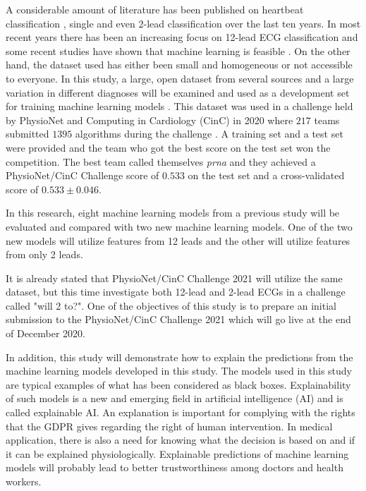 A considerable amount of literature has been published on heartbeat classification \cite{annam_classification_2020}, single \cite{mathews_novel_2018} and even  2-lead classification \cite{liu_arrhythmia_2013} over the last ten years. In most recent years there has been an increasing focus on 12-lead ECG classification and some recent studies have shown that machine learning is feasible \cite{ribeiro_automatic_2020, yao_multi-class_2020,li_automatic_2020, chen_detection_2020}. On the other hand, the  dataset used has either been small and homogeneous \cite{noauthor_classification_nodate} or not accessible to everyone. In this study, a large, open dataset from several sources and a large variation in different diagnoses will be examined and used as a development set for training machine learning models \cite{alday_classification_2020}. This dataset was used in a challenge held by PhysioNet \cite{goldberger_physiobank_2000} and Computing in Cardiology (CinC) in 2020 where $217$ teams submitted $1395$ algorithms during the challenge \cite{alday_classification_2020}. A training set and a test set were provided and the team who got the best score on the test set won the competition. The best team called themselves \textit{prna} and they achieved a PhysioNet/CinC Challenge score \cite{alday_classification_2020} of $0.533$ on the test set and a cross-validated score of $0.533\pm 0.046$. 

In this research, eight machine learning models from a previous study \cite{singstad_convolutional_nodate} will be evaluated and compared with two new machine learning models.  One of the two new models will utilize features from 12 leads and the other will utilize features from only 2 leads. 

It is already stated that PhysioNet/CinC Challenge 2021 will utilize the same dataset, but this time investigate both 12-lead and 2-lead ECGs in a challenge called "will 2 to?". One of the objectives of this study is to prepare an initial submission to the PhysioNet/CinC Challenge 2021 which will go live at the end of December 2020.

In addition, this study will demonstrate how to explain the predictions from the machine learning models developed in this study. The models used in this study are typical examples of what has been considered as black boxes. Explainability of such models is a new and emerging field in artificial intelligence (AI) and is called explainable AI. An explanation is important for complying with the rights that the GDPR gives regarding the right of human intervention. In medical application, there is also a need for knowing what the decision is based on and if it can be explained physiologically. Explainable predictions of machine learning models will probably lead to better trustworthiness  among doctors and health workers. 